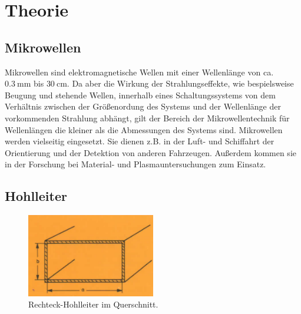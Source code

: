 \section{Theorie}
\label{sec:Theorie}



\subsection{Mikrowellen}

Mikrowellen sind elektromagnetische Wellen mit einer Wellenlänge von ca. $\SI{0.3}{\milli\m}$ bis $\SI{30}{\centi\m}$. Da aber die Wirkung der Strahlungseffekte, wie bespielsweise Beugung und stehende Wellen, innerhalb eines Schaltungssystems von dem Verhältnis zwischen der Größenordung des Systems und der Wellenlänge der vorkommenden Strahlung abhängt, gilt der Bereich der Mikrowellentechnik für Wellenlängen die  kleiner als die Abmessungen des Systems sind. Mikrowellen werden vielseitig eingesetzt. Sie dienen z.B. in der Luft- und Schiffahrt der Orientierung und der Detektion von anderen Fahrzeugen. Außerdem kommen sie in der Forschung bei Material- und Plasmauntersuchungen zum Einsatz. 

\subsection{Hohlleiter}


\begin{figure}
    \centering
    \includegraphics[width=0.5\textwidth]{Bilder/hohlleiter_querschnitt.PNG}
    \caption{Rechteck-Hohlleiter im Querschnitt.\cite{Mikrowellen}}
    \label{fig:hohlleiter}
\end{figure}



